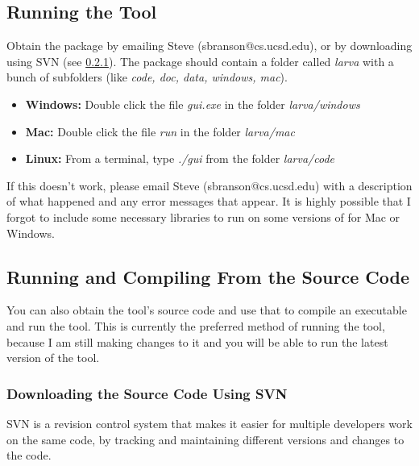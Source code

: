 \documentclass[10pt, onecolumn]{article}
\newcommand{\1}{\textbf{1}}
\begin{document}
\subsection{Running the Tool}
Obtain the package by emailing Steve (sbranson@cs.ucsd.edu), or by downloading using SVN (see \ref{sec:svn}).  The package should contain a folder called \textit{larva} with a bunch of subfolders (like \textit{code, doc, data, windows, mac}).
\begin{itemize}
 \item \textbf{Windows: } Double click the file \textit{gui.exe} in the folder \textit{larva/windows}
 \item \textbf{Mac: } Double click the file \textit{run} in the folder \textit{larva/mac}
 \item \textbf{Linux: } From a terminal, type \textit{./gui} from the folder \textit{larva/code}
\end{itemize}
If this doesn't work, please email Steve (sbranson@cs.ucsd.edu) with a description of what happened and any error messages that appear.  It is highly possible that I forgot to include some necessary libraries to run on some versions of for Mac or Windows.

\subsection{Running and Compiling From the Source Code}
You can also obtain the tool's source code and use that to compile an executable and run the tool.  This is currently the preferred method of running the tool, because I am still making changes to it and you will be able to run the latest version of the tool.

\subsubsection{Downloading the Source Code Using SVN}
\label{sec:svn}
SVN is a revision control system that makes it easier for multiple developers work on the same code, by tracking and maintaining different versions and changes to the code.
\end{document}
